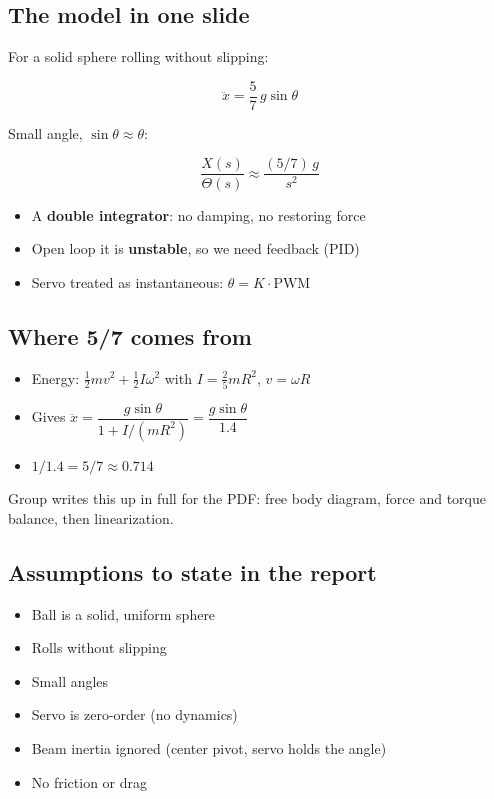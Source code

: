 \documentclass[11pt]{article}
\begin{document}
\subsection*{The model in one slide}
\label{sec:org9e37687}
For a solid sphere rolling without slipping:

\[ \ddot{x} = \frac{5}{7}\, g \sin\theta \]

Small angle, \(\sin\theta \approx \theta\):

\[ \frac{X(s)}{\Theta(s)} \approx \frac{(5/7)\,g}{s^{2}} \]

\begin{itemize}
\item A \textbf{double integrator}: no damping, no restoring force
\item Open loop it is \textbf{unstable}, so we need feedback (PID)
\item Servo treated as instantaneous: \(\theta = K \cdot \text{PWM}\)
\end{itemize}
\subsection*{Where 5/7 comes from}
\label{sec:org2696531}
\begin{itemize}
\item Energy: \(\tfrac12 m v^2 + \tfrac12 I \omega^2\) with \(I = \tfrac25 m R^2\), \(v = \omega R\)
\item Gives \(\ddot{x} = \dfrac{g \sin\theta}{1 + I/(mR^2)} = \dfrac{g\sin\theta}{1.4}\)
\item \(1/1.4 = 5/7 \approx 0.714\)
\end{itemize}

\begin{NOTES}
Group writes this up in full for the PDF: free body diagram, force and torque balance, then linearization.
\end{NOTES}
\subsection*{Assumptions to state in the report}
\label{sec:org5f94c13}
\begin{itemize}
\item Ball is a solid, uniform sphere
\item Rolls without slipping
\item Small angles
\item Servo is zero-order (no dynamics)
\item Beam inertia ignored (center pivot, servo holds the angle)
\item No friction or drag
\end{itemize}
\end{document}

